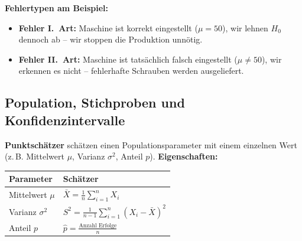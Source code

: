 \noindent\textbf{Fehlertypen am Beispiel:}
\begin{itemize}[leftmargin=1.5em]
    \item \textbf{Fehler I.\ Art:} Maschine ist korrekt eingestellt ($\mu=50$), wir lehnen $H_0$ dennoch ab -- wir stoppen die Produktion unnötig.
    \item \textbf{Fehler II.\ Art:} Maschine ist tatsächlich falsch eingestellt ($\mu\neq 50$), wir erkennen es nicht -- fehlerhafte Schrauben werden ausgeliefert.
\end{itemize}

\newpage

\subsection{Population, Stichproben und Konfidenzintervalle}


\textbf{Punktschätzer} schätzen einen Populationsparameter mit einem einzelnen Wert (z.\,B. Mittelwert $\mu$, Varianz $\sigma^2$, Anteil $p$). \textbf{Eigenschaften:}

\begin{center}
\small
\begin{tabular}{|l|l|}
\hline
\textbf{Parameter} & \textbf{Schätzer} \\
\hline
Mittelwert $\mu$ & $\bar{X} = \frac{1}{n}\sum_{i=1}^n X_i$ \\[4pt]
\hline
Varianz $\sigma^2$ & $S^2 = \frac{1}{n-1}\sum_{i=1}^n (X_i - \bar{X})^2$ \\[4pt]
\hline
Anteil $p$ & $\hat{p} = \frac{\text{Anzahl Erfolge}}{n}$ \\[4pt]
\hline
\end{tabular}
\end{center}


